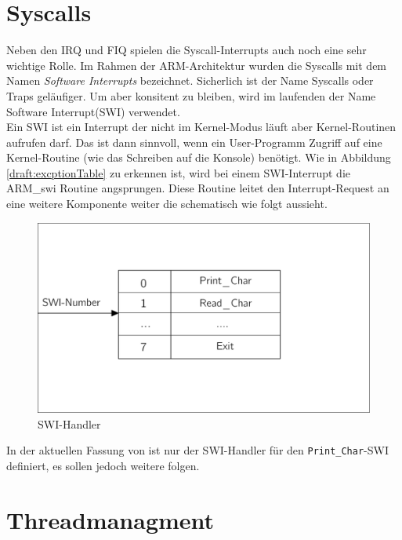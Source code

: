 \section{Syscalls}
Neben den IRQ und FIQ spielen die Syscall-Interrupts auch noch eine sehr wichtige Rolle. Im Rahmen der ARM-Architektur wurden die Syscalls mit dem Namen \textit{Software Interrupts} bezeichnet. Sicherlich ist der Name Syscalls oder Traps gel\"aufiger. Um aber konsitent zu bleiben, wird im laufenden der Name Software Interrupt(SWI) verwendet.\\
Ein SWI ist ein Interrupt der nicht im Kernel-Modus l\"auft aber Kernel-Routinen aufrufen darf. Das ist dann sinnvoll, wenn ein User-Programm Zugriff auf eine Kernel-Routine (wie das Schreiben auf die Konsole) ben\"otigt. Wie in Abbildung \ref{draft:excptionTable} zu erkennen ist, wird bei einem SWI-Interrupt die ARM\_swi Routine angsprungen. Diese Routine leitet den Interrupt-Request an eine weitere Komponente weiter die schematisch wie folgt aussieht.
\begin{figure}[H]
	\begin{center}	
	\caption{SWI-Handler}
	\includegraphics[scale=0.60]{common/swihandler.pdf}
	\end{center}
\end{figure}
\noindent
In der aktuellen Fassung von \mops ist nur der SWI-Handler f\"ur den \texttt{Print\_Char}-SWI definiert, es sollen jedoch weitere folgen.
\section{Threadmanagment}
